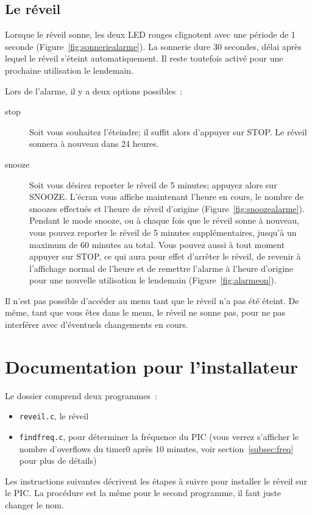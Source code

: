 \documentclass[12pt,a4paper]{article}
\begin{document}
\subsection{Le réveil}
Lorsque le réveil sonne, les deux LED rouges clignotent avec une période de 1 seconde (Figure~\ref{fig:sonneriealarme}). La sonnerie dure 30 secondes, délai après lequel le réveil s'éteint automatiquement. Il reste toutefois activé pour une prochaine utilisation le lendemain.

Lors de l'alarme, il y a deux options possibles~:
\begin{description}
\item[stop] Soit vous souhaitez l'éteindre; il suffit alors d'appuyer sur STOP. Le réveil sonnera à nouveau dans 24 heures.
\item[snooze] Soit vous désirez reporter le réveil de 5 minutes; appuyez alors sur SNOOZE. L'écran vous affiche maintenant l'heure en cours, le nombre de snoozes effectués et l'heure de réveil d'origine (Figure~\ref{fig:snoozealarme}). Pendant le mode snooze, ou à chaque fois que le réveil sonne à nouveau, vous pouvez reporter le réveil de 5 minutes supplémentaires, jusqu'à un maximum de 60 minutes au total. Vous pouvez aussi à tout moment appuyer sur STOP, ce qui aura pour effet d'arrêter le réveil, de revenir à l'affichage normal de l'heure et de remettre l'alarme à l'heure d'origine pour une nouvelle utilisation le lendemain (Figure~\ref{fig:alarmeon}).
\end{description}

Il n'est pas possible d'accéder au menu tant que le réveil n'a pas été éteint. De même, tant que vous êtes dans le menu, le réveil ne sonne pas, pour ne pas interférer avec d'éventuels changements en cours.

\section{Documentation pour l'installateur}
Le dossier comprend deux programmes~:
\begin{itemize}
\item \texttt{reveil.c}, le réveil %
\item \texttt{findfreq.c}, pour déterminer la fréquence du PIC (vous verrez s'afficher le nombre d'overflows du timer0 après 10 minutes, voir section~\ref{subsec:freq} pour plus de détails)
\end{itemize}
Les instructions suivantes décrivent les étapes à suivre pour installer le réveil sur le PIC. La procédure est la même pour le second programme, il faut juste changer le nom.
\end{document}
